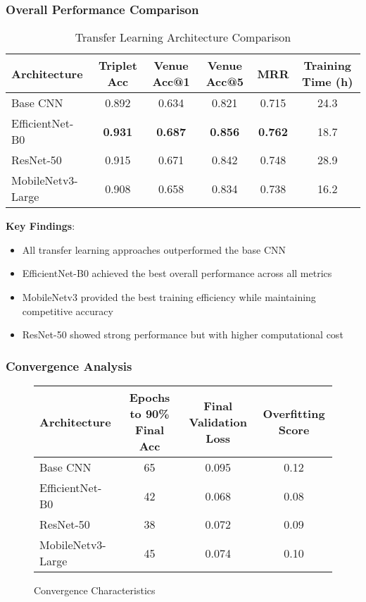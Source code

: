 \subsubsection{Overall Performance Comparison}

\begin{table}[H]
\centering
\caption{Transfer Learning Architecture Comparison}
\begin{tabular}{|l|c|c|c|c|c|}
\hline
\textbf{Architecture} & \textbf{Triplet Acc} & \textbf{Venue Acc@1} & \textbf{Venue Acc@5} & \textbf{MRR} & \textbf{Training Time (h)} \\
\hline
Base CNN & 0.892 & 0.634 & 0.821 & 0.715 & 24.3 \\
EfficientNet-B0 & \textbf{0.931} & \textbf{0.687} & \textbf{0.856} & \textbf{0.762} & 18.7 \\
ResNet-50 & 0.915 & 0.671 & 0.842 & 0.748 & 28.9 \\
MobileNetv3-Large & 0.908 & 0.658 & 0.834 & 0.738 & 16.2 \\
\hline
\end{tabular}
\end{table}

\textbf{Key Findings}:
\begin{itemize}
    \item All transfer learning approaches outperformed the base CNN
    \item EfficientNet-B0 achieved the best overall performance across all metrics
    \item MobileNetv3 provided the best training efficiency while maintaining competitive accuracy
    \item ResNet-50 showed strong performance but with higher computational cost
\end{itemize}

\subsubsection{Convergence Analysis}

\begin{figure}[H]
\centering
\begin{tabular}{|l|c|c|c|}
\hline
\textbf{Architecture} & \textbf{Epochs to 90\% Final Acc} & \textbf{Final Validation Loss} & \textbf{Overfitting Score} \\
\hline
Base CNN & 65 & 0.095 & 0.12 \\
EfficientNet-B0 & 42 & 0.068 & 0.08 \\
ResNet-50 & 38 & 0.072 & 0.09 \\
MobileNetv3-Large & 45 & 0.074 & 0.10 \\
\hline
\end{tabular}
\caption{Convergence Characteristics}
\end{figure}

